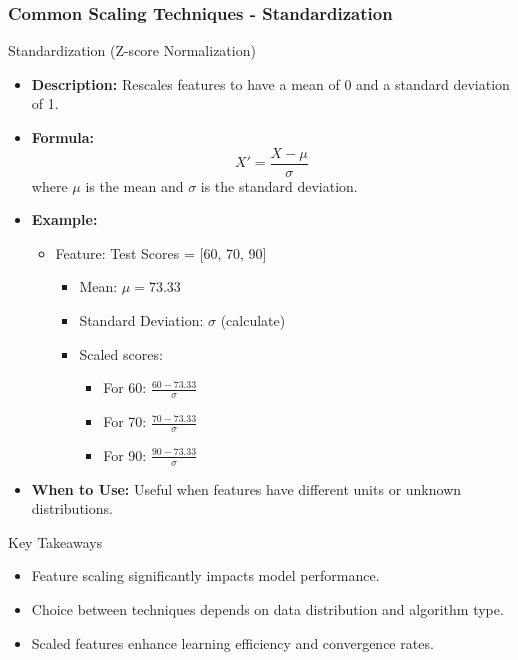 \documentclass[aspectratio=169]{beamer}
\begin{document}
\begin{frame}[fragile]
    \frametitle{Common Scaling Techniques - Standardization}
    \begin{block}{Standardization (Z-score Normalization)}
        \begin{itemize}
            \item \textbf{Description:} Rescales features to have a mean of 0 and a standard deviation of 1.
            \item \textbf{Formula:}
            \begin{equation}
            X' = \frac{X - \mu}{\sigma}
            \end{equation}
            where $\mu$ is the mean and $\sigma$ is the standard deviation.
            \item \textbf{Example:} 
            \begin{itemize}
                \item Feature: Test Scores = [60, 70, 90]
                \begin{itemize}
                    \item Mean: $\mu = 73.33$ 
                    \item Standard Deviation: $\sigma$ (calculate)
                    \item Scaled scores: 
                    \begin{itemize}
                        \item For 60: $\frac{60 - 73.33}{\sigma}$
                        \item For 70: $\frac{70 - 73.33}{\sigma}$
                        \item For 90: $\frac{90 - 73.33}{\sigma}$
                    \end{itemize}
                \end{itemize}
            \end{itemize}
            \item \textbf{When to Use:} Useful when features have different units or unknown distributions.
        \end{itemize}
    \end{block}
    
    \begin{block}{Key Takeaways}
        \begin{itemize}
            \item Feature scaling significantly impacts model performance.
            \item Choice between techniques depends on data distribution and algorithm type.
            \item Scaled features enhance learning efficiency and convergence rates.
        \end{itemize}
    \end{block}
\end{frame}
\end{document}
